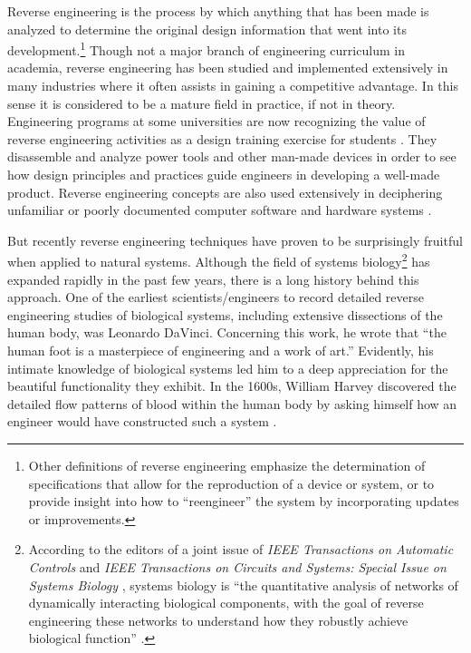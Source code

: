 Reverse engineering is the process by which anything that has been made
is analyzed to determine the original design information that went into
its development.\footnote{
Other definitions of reverse engineering emphasize
the determination of specifications that allow for the reproduction of
a device or system, or to provide insight into how to “reengineer” the
system by incorporating updates or improvements.
} Though not a major branch of
engineering curriculum in academia, reverse engineering has been
studied and implemented extensively in many industries where it often
assists in gaining a competitive advantage. In this sense it is
considered to be a mature field in practice, if not in theory.
Engineering programs at some universities are now recognizing the value
of reverse engineering activities as a design training exercise for
students \citep[][pp. 57--59]{wu2008}.
They disassemble and analyze power tools
and other man-made devices in order to see how design principles and
practices guide engineers in developing a well-made product. Reverse
engineering concepts are also used extensively in deciphering
unfamiliar or poorly documented computer software and hardware
systems \citep{eilam2005}.

But recently reverse engineering techniques have proven to be
surprisingly fruitful when applied to natural systems. Although the
field of systems biology\footnote{
According to the editors of a joint issue of
\textit{IEEE Transactions on Automatic Controls} and \textit{IEEE
Transactions on Circuits and Systems: Special Issue on Systems Biology
}, systems biology is “the quantitative analysis of
networks of dynamically interacting biological components, with the
goal of reverse engineering these networks to understand how they
robustly achieve biological function” \citep[][p.~4]{joint2008}.
} has expanded rapidly in
the past few years, there is a long history behind this approach. One
of the earliest scientists/engineers to record detailed reverse
engineering studies of biological systems, including extensive
dissections of the human body, was Leonardo DaVinci. Concerning this
work, he wrote that “the human foot is a masterpiece of engineering and
a work of art.” Evidently, his intimate knowledge of biological systems
led him to a deep appreciation for the beautiful functionality they
exhibit. In the 1600s, William Harvey discovered the detailed flow
patterns of blood within the human body by asking himself how an
engineer would have constructed such a system \citep{auffraynoble2009}.

